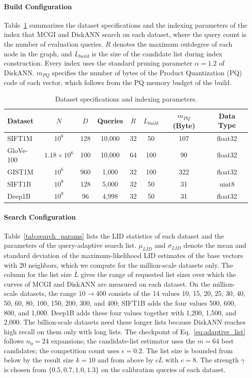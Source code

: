 \documentclass{article}
\theoremstyle{plain}
\theoremstyle{definition}
\theoremstyle{remark}
\newcommand{\ours}{MCGI\xspace}
\begin{document}
\paragraph{Build Configuration}
Table~\ref{tab:build_params} summarizes the dataset specifications and the indexing parameters of the index that \ours{} and DiskANN search on each dataset, where the query count is the number of evaluation queries. $R$ denotes the maximum outdegree of each node in the graph, and $L_{build}$ is the size of the candidate list during index construction. Every index uses the standard pruning parameter $\alpha = 1.2$ of DiskANN. $m_{PQ}$ specifies the number of bytes of the Product Quantization (PQ) code of each vector, which follows from the PQ memory budget of the build.

\begin{table}[t]
\centering
\caption{Dataset specifications and indexing parameters.}
\label{tab:build_params}
\begin{tabular}{lccccccc}
\toprule
Dataset & $N$ & $D$ & Queries & $R$ & $L_{build}$ & $m_{PQ}$ (Byte) & Data Type\\
\midrule
SIFT1M    & $10^6$ & 128 & 10{,}000 & 32 & 50  & 107 & float32 \\
GloVe-100 & $1.18 \times 10^6$ & 100 & 10{,}000 & 64 & 100 & 90  & float32 \\
GIST1M    & $10^6$ & 960 & 1{,}000  & 32 & 100 & 322 & float32 \\
SIFT1B    & $10^9$ & 128 & 5{,}000  & 32 & 50  & 31  & uint8   \\
Deep1B    & $10^9$ & 96  & 4{,}998  & 32 & 50  & 31  & float32 \\
\bottomrule
\end{tabular}
\end{table}

\paragraph{Search Configuration}
Table~\ref{tab:search_params} lists the LID statistics of each dataset and the parameters of the query-adaptive search list. $\mu_{LID}$ and $\sigma_{LID}$ denote the mean and standard deviation of the maximum-likelihood LID estimates of the base vectors with 20 neighbors, which we compute for the million-scale datasets only. The column for the list size $\bar{L}$ gives the range of requested list sizes over which the curves of \ours{} and DiskANN are measured on each dataset. On the million-scale datasets, the range $10 \to 400$ consists of the 14 values 10, 15, 20, 25, 30, 40, 50, 60, 80, 100, 150, 200, 300, and 400; SIFT1B adds the four values 500, 600, 800, and 1{,}000. Deep1B adds these four values together with 1{,}200, 1{,}500, and 2{,}000. The billion-scale datasets need these longer lists because DiskANN reaches high recall on them only with long lists. The checkpoint of Eq.~\eqref{eq:adaptive_list} follows $n_0 = 24$ expansions; the candidate-list estimator uses the $m = 64$ best candidates; the competition count uses $\epsilon = 0.2$. The list size is bounded from below by the result size $k = 10$ and from above by $c\bar{L}$ with $c = 8$. The strength $\gamma$ is chosen from $\{0.5, 0.7, 1.0, 1.3\}$ on the calibration queries of each dataset.
\end{document}
